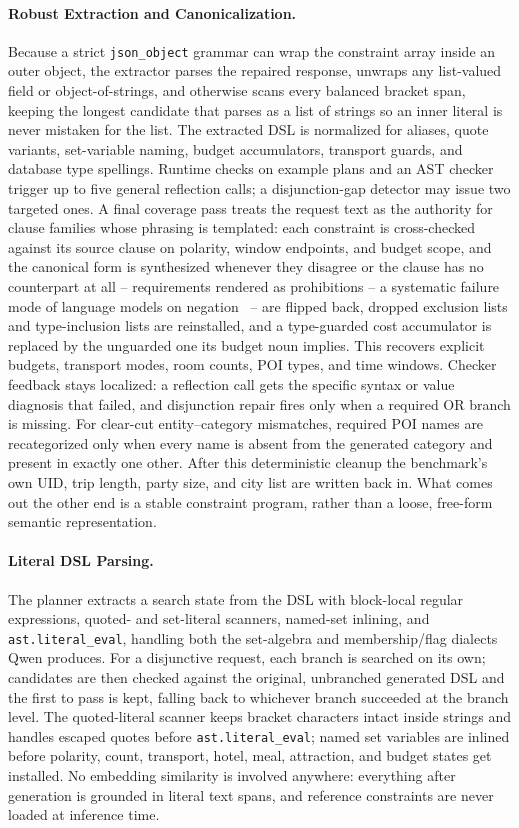 \documentclass{article}
\begin{document}
\paragraph{Robust Extraction and Canonicalization.}
Because a strict \texttt{json\_object} grammar can wrap the constraint
array inside an outer object, the extractor parses the repaired response,
unwraps any list-valued field or object-of-strings, and otherwise scans
every balanced bracket span, keeping the longest candidate that parses as a
list of strings so an inner literal is never mistaken for the list. The extracted DSL is normalized for aliases, quote variants, set-variable
naming, budget accumulators, transport guards, and database type spellings.
Runtime checks on example plans and an AST checker trigger up to five
general reflection calls; a disjunction-gap detector may issue two targeted
ones. A final coverage pass treats the request text as the authority for clause
families whose phrasing is templated: each constraint is cross-checked
against its source clause on polarity, window endpoints, and budget scope,
and the canonical form is synthesized whenever they disagree or the clause
has no counterpart at all -- requirements rendered as prohibitions -- a systematic failure mode of
language models on negation~\cite{negation} -- are flipped back, dropped
exclusion lists and type-inclusion lists are reinstalled, and a
type-guarded cost accumulator is replaced by the unguarded one its budget
noun implies. This recovers explicit budgets, transport modes, room
counts, POI types, and time windows. Checker feedback stays localized: a reflection call gets the specific
syntax or value diagnosis that failed, and disjunction repair fires only
when a required OR branch is missing. For clear-cut entity--category
mismatches, required POI names are recategorized only when every name is
absent from the generated category and present in exactly one other. After
this deterministic cleanup the benchmark's own UID, trip length, party
size, and city list are written back in. What comes out the other end is a stable constraint program,
rather than a loose, free-form semantic representation.
 
\paragraph{Literal DSL Parsing.}
The planner extracts a search state from the DSL with block-local regular
expressions, quoted- and set-literal scanners, named-set inlining, and
\texttt{ast.literal\_eval}, handling both the set-algebra and
membership/flag dialects Qwen produces. For a disjunctive
request, each branch is searched on its own; candidates are then checked
against the original, unbranched generated DSL and the first to pass is
kept, falling back to whichever branch succeeded at the branch level. The
quoted-literal scanner keeps bracket characters intact inside strings and
handles escaped quotes before \texttt{ast.literal\_eval}; named set
variables are inlined before polarity, count, transport, hotel, meal,
attraction, and budget states get installed. No embedding similarity is
involved anywhere: everything after generation is grounded in literal text
spans, and reference constraints are never loaded at inference time.
 
\end{document}
